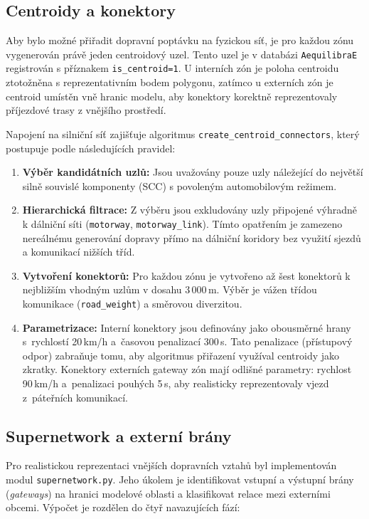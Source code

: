 \subsection{Centroidy a konektory}
\label{sec:impl-zones-centroids}

Aby bylo možné přiřadit dopravní poptávku na fyzickou síť, je pro každou zónu vygenerován právě jeden centroidový uzel. Tento uzel je v databázi \texttt{AequilibraE} registrován s příznakem \texttt{is\_centroid=1}. U interních zón je poloha centroidu ztotožněna s reprezentativním bodem polygonu, zatímco u externích zón je centroid umístěn vně hranic modelu, aby konektory korektně reprezentovaly příjezdové trasy z vnějšího prostředí.

Napojení na silniční síť zajišťuje algoritmus \texttt{create\_centroid\_connectors}, který postupuje podle následujících pravidel:
\begin{enumerate}
    \item \textbf{Výběr kandidátních uzlů:} Jsou uvažovány pouze uzly náležející do největší silně souvislé komponenty (SCC) s povoleným automobilovým režimem.
    \item \textbf{Hierarchická filtrace:} Z výběru jsou exkludovány uzly připojené výhradně k dálniční síti (\texttt{motorway}, \texttt{motorway\_link}). Tímto opatřením je zamezeno nereálnému generování dopravy přímo na dálniční koridory bez využití sjezdů a komunikací nižších tříd.
    \item \textbf{Vytvoření konektorů:} Pro každou zónu je vytvořeno až šest konektorů k nejbližším vhodným uzlům v dosahu 3\,000\,m. Výběr je vážen třídou komunikace (\texttt{road\_weight}) a směrovou diverzitou.
    \item \textbf{Parametrizace:} Interní konektory jsou definovány jako obousměrné hrany s~rychlostí 20\,km/h a~časovou penalizací 300\,s. Tato penalizace (přístupový odpor) zabraňuje tomu, aby algoritmus přiřazení využíval centroidy jako zkratky. Konektory externích gateway zón mají odlišné parametry: rychlost 90\,km/h a~penalizaci pouhých 5\,s, aby realisticky reprezentovaly vjezd z~páteřních komunikací.
\end{enumerate}

\subsection{Supernetwork a externí brány}
\label{sec:impl-zones-supernetwork}

Pro realistickou reprezentaci vnějších dopravních vztahů byl implementován modul \texttt{supernetwork.py}. Jeho úkolem je identifikovat vstupní a výstupní brány (\textit{gateways}) na hranici modelové oblasti a klasifikovat relace mezi externími obcemi. Výpočet je rozdělen do čtyř navazujících fází:

